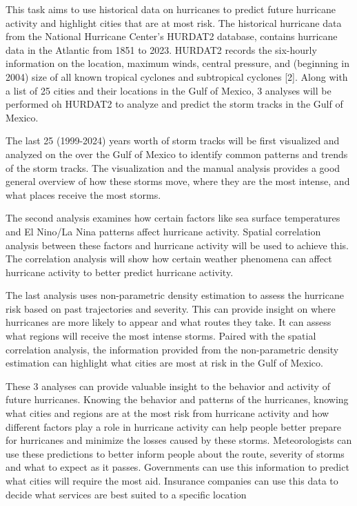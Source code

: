 \documentclass[12pt,letterpaper]{article}
\begin{document}
This task aims to use historical data on hurricanes to predict future
hurricane activity and highlight cities that are at most risk. The
historical hurricane data from the National Hurricane Center's HURDAT2
database, contains hurricane data in the Atlantic from 1851 to 2023.
HURDAT2 records the six-hourly information on the location, maximum
winds, central pressure, and (beginning in 2004) size of all known
tropical cyclones and subtropical cyclones {[}2{]}. Along with a list of
25 cities and their locations in the Gulf of Mexico, 3 analyses will be
performed oh HURDAT2 to analyze and predict the storm tracks in the Gulf
of Mexico.

The last 25 (1999-2024) years worth of storm tracks will be first
visualized and analyzed on the over the Gulf of Mexico to identify
common patterns and trends of the storm tracks. The visualization and
the manual analysis provides a good general overview of how these storms
move, where they are the most intense, and what places receive the most
storms.

The second analysis examines how certain factors like sea surface
temperatures and El Nino/La Nina patterns affect hurricane activity.
Spatial correlation analysis between these factors and hurricane
activity will be used to achieve this. The correlation analysis will
show how certain weather phenomena can affect hurricane activity to
better predict hurricane activity.

The last analysis uses non-parametric density estimation to assess the
hurricane risk based on past trajectories and severity. This can provide
insight on where hurricanes are more likely to appear and what routes
they take. It can assess what regions will receive the most intense
storms. Paired with the spatial correlation analysis, the information
provided from the non-parametric density estimation can highlight what
cities are most at risk in the Gulf of Mexico.

These 3 analyses can provide valuable insight to the behavior and
activity of future hurricanes. Knowing the behavior and patterns of the
hurricanes, knowing what cities and regions are at the most risk from
hurricane activity and how different factors play a role in hurricane
activity can help people better prepare for hurricanes and minimize the
losses caused by these storms. Meteorologists can use these predictions
to better inform people about the route, severity of storms and what to
expect as it passes. Governments can use this information to predict
what cities will require the most aid. Insurance companies can use this
data to decide what services are best suited to a specific location
\end{document}
